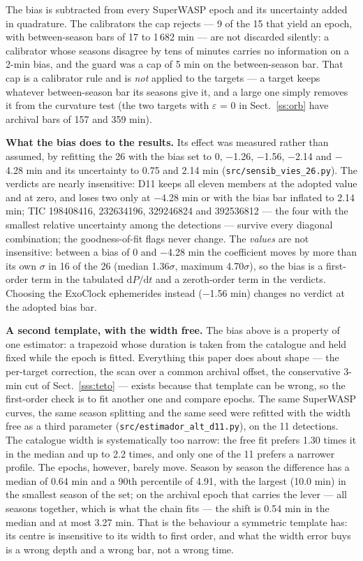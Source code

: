 \documentclass{aa}
\begin{document}
The bias is subtracted from every SuperWASP epoch and its uncertainty added in quadrature. The calibrators the cap rejects --- 9 of the 15 that yield an epoch, with between-season bars of 17 to 1\,682 min --- are not discarded silently: a calibrator whose seasons disagree by tens of minutes carries no information on a 2-min bias, and the guard was a cap of 5 min on the between-season bar. That cap is a calibrator rule and is \textit{not} applied to the targets --- a target keeps whatever between-season bar its seasons give it, and a large one simply removes it from the curvature test (the two targets with $\varepsilon$ = 0 in Sect.~\ref{ss:orb} have archival bars of 157 and 359 min).

\textbf{What the bias does to the results.} Its effect was measured rather than assumed, by refitting the 26 with the bias set to 0, $-$1.26, $-$1.56, $-$2.14 and $-$4.28 min and its uncertainty to 0.75 and 2.14 min (\texttt{src/\allowbreak sensib\_\allowbreak vies\_\allowbreak 26.py}). The verdicts are nearly insensitive: D11 keeps all eleven members at the adopted value and at zero, and loses two only at $-$4.28 min or with the bias bar inflated to 2.14 min; TIC 198408416, 232634196, 329246824 and 392536812 --- the four with the smallest relative uncertainty among the detections --- survive every diagonal combination; the goodness-of-fit flags never change. The \textit{values} are not insensitive: between a bias of 0 and $-$4.28 min the coefficient moves by more than its own $\sigma$ in 16 of the 26 (median 1.36$\sigma$, maximum 4.70$\sigma$), so the bias is a first-order term in the tabulated $\mathrm{d}P/\mathrm{d}t$ and a zeroth-order term in the verdicts. Choosing the ExoClock ephemerides instead ($-$1.56 min) changes no verdict at the adopted bias bar.

\textbf{A second template, with the width free.} The bias above is a property of one estimator: a trapezoid whose duration is taken from the catalogue and held fixed while the epoch is fitted. Everything this paper does about shape --- the per-target correction, the scan over a common archival offset, the conservative 3-min cut of Sect.~\ref{sss:teto} --- exists because that template can be wrong, so the first-order check is to fit another one and compare epochs. The same SuperWASP curves, the same season splitting and the same seed were refitted with the width free as a third parameter (\texttt{src/\allowbreak estimador\_\allowbreak alt\_\allowbreak d11.py}), on the 11 detections. The catalogue width is systematically too narrow: the free fit prefers 1.30 times it in the median and up to 2.2 times, and only one of the 11 prefers a narrower profile. The epochs, however, barely move. Season by season the difference has a median of 0.64 min and a 90th percentile of 4.91, with the largest (10.0 min) in the smallest season of the set; on the archival epoch that carries the lever --- all seasons together, which is what the chain fits --- the shift is 0.54 min in the median and at most 3.27 min. That is the behaviour a symmetric template has: its centre is insensitive to its width to first order, and what the width error buys is a wrong depth and a wrong bar, not a wrong time.
\end{document}
